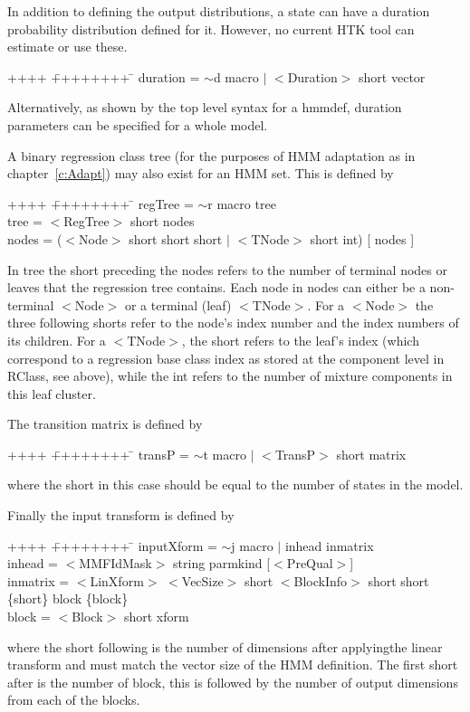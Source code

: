 In addition to defining the output distributions, a state can have a
duration probability distribution defined for it. However, no current HTK
tool can estimate or use these.
{\sf
\begin{tabbing}
++++ \= ++++++++ \=  \kill
\>   duration = \> $\sim$d macro $|$ $<$Duration$>$ short vector
\end{tabbing}
}
\noindent
Alternatively, as shown by the top level syntax for a {\sf hmmdef},
duration parameters can be specified for a whole model.

A binary regression class tree (for the purposes of HMM adaptation as in
chapter~\ref{c:Adapt}) may also exist for an HMM set. This is defined
by 
{\sf
\begin{tabbing}
++++ \= ++++++++ \=  \kill
\>   regTree = \> $\sim$r macro tree \\
\>   tree    = \> $<$RegTree$>$ short nodes \\
\>   nodes   = \> ($<$Node$>$ short short short $|$ $<$TNode$>$ short
int) [ nodes ]
\end{tabbing}
}
\noindent
In {\sf tree} the {\sf short} preceding the {\sf nodes} refers to
the number of terminal nodes or leaves that the regression tree
contains. Each node in {\sf nodes} can either be a non-terminal {\sf
$<$Node$>$} or a terminal (leaf) {\sf $<$TNode$>$}. For a {\sf
$<$Node$>$} the three following {\sf short}s refer to the node's index
number and the index numbers of its children. For a {\sf
$<$TNode$>$}, the {\sf short} refers to the leaf's index (which
correspond to a regression base class index as stored at the
component level in {\sf RClass}, see above), while the {\sf int}
refers to the number of mixture components in this leaf cluster.

The transition matrix is defined by
{\sf
\begin{tabbing}
++++ \= ++++++++ \=  \kill
\>   transP = \> $\sim$t macro $|$ $<$TransP$>$ short matrix
\end{tabbing}
}
\noindent
where the {\sf short} in this case should be equal to the number of
states in the model. 

Finally the input transform is defined by
{\sf
\begin{tabbing}
++++ \= ++++++++ \=  \kill
\>  inputXform  = \> $\sim$j macro $|$ inhead inmatrix\\
\>  inhead      = \> $<$MMFIdMask$>$ string parmkind [$<$PreQual$>$]\\
\>  inmatrix    = \> $<$LinXform$>$ $<$VecSize$>$ short $<$BlockInfo$>$ 
short short \{short\} block \{block\}\\
\>  block       = \> $<$Block$>$ short xform
\end{tabbing}
}
\noindent
where the {\sf short} following  is the number of dimensions
after applyingthe linear transform and must match the vector size
of the HMM definition. The first {\sf short} after 
is the number of block, this is followed by the number of output
dimensions from each of the blocks.


